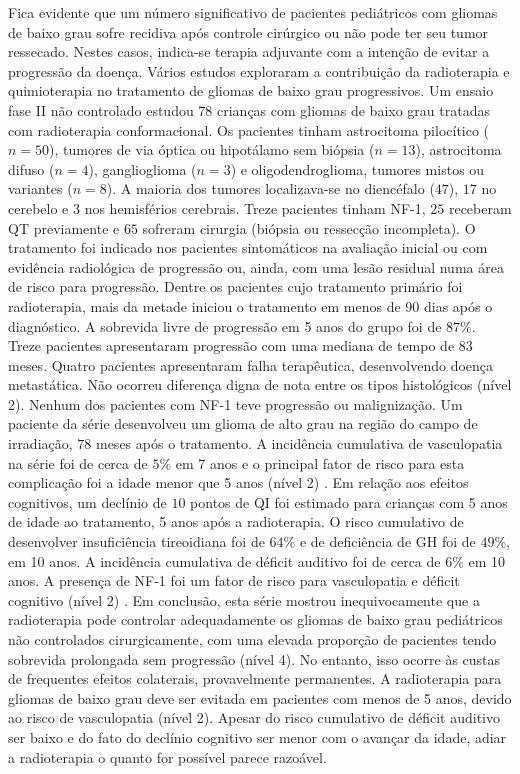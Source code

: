 \documentclass[11pt,a4paper,oldfontcommands]{memoir}
\begin{document}
Fica evidente que um número significativo de pacientes pediátricos com gliomas de baixo grau sofre recidiva após controle cirúrgico ou não pode ter seu tumor ressecado. Nestes casos, indica-se terapia adjuvante com a intenção de evitar a progressão da doença. Vários estudos exploraram a contribuição da radioterapia e quimioterapia no tratamento de gliomas de baixo grau progressivos. Um ensaio fase II não controlado estudou 78 crianças com gliomas de baixo grau tratadas com radioterapia conformacional. Os pacientes tinham astrocitoma pilocítico (\(n=50\)), tumores de via óptica ou hipotálamo sem biópsia (\(n=13\)), astrocitoma difuso (\(n=4\)), ganglioglioma (\(n=3\)) e oligodendroglioma, tumores mistos ou variantes (\(n=8\)). A maioria dos tumores localizava-se no diencéfalo (\(47\)), \(17\) no cerebelo e \(3\) nos hemisférios cerebrais. Treze pacientes tinham NF-1, \(25\) receberam QT previamente e \(65\) sofreram cirurgia (biópsia ou ressecção incompleta). O tratamento foi indicado nos pacientes sintomáticos na avaliação inicial ou com evidência radiológica de progressão ou, ainda, com uma lesão residual numa área de risco para progressão. Dentre os pacientes cujo tratamento primário foi radioterapia, mais da metade iniciou o tratamento em menos de 90 dias após o diagnóstico. A sobrevida livre de progressão em 5 anos do grupo foi de \(87\%\). Treze pacientes apresentaram progressão com uma mediana de tempo de \(83\) meses. Quatro pacientes apresentaram falha terapêutica, desenvolvendo doença metastática. Não ocorreu diferença digna de nota entre os tipos histológicos (nível 2). Nenhum dos pacientes com NF-1 teve progressão ou malignização. Um paciente da série desenvolveu um glioma de alto grau na região do campo de irradiação, \(78\) meses após o tratamento. A incidência cumulativa de vasculopatia na série foi de cerca de \(5\%\) em 7 anos e o principal fator de risco para esta complicação foi a idade menor que 5 anos (nível 2) \cite{Merchant01082009}. Em relação aos efeitos cognitivos, um declínio de \(10\) pontos de QI foi estimado para crianças com 5 anos de idade ao tratamento, 5 anos após a radioterapia. O risco cumulativo de desenvolver insuficiência tireoidiana foi de \(64\%\) e de deficiência de GH foi de \(49\%\), em 10 anos. A incidência cumulativa de déficit auditivo foi de cerca de \(6\%\) em 10 anos. A presença de NF-1 foi um fator de risco para vasculopatia e déficit cognitivo (nível 2) \cite{Merchant01082009.2}. Em conclusão, esta série mostrou inequivocamente que a radioterapia pode controlar adequadamente os gliomas de baixo grau pediátricos não controlados cirurgicamente, com uma elevada proporção de pacientes tendo sobrevida prolongada sem progressão (nível 4). No entanto, isso ocorre às custas de frequentes efeitos colaterais, provavelmente permanentes. A radioterapia para gliomas de baixo grau deve ser evitada em pacientes com menos de 5 anos, devido ao risco de vasculopatia (nível 2). Apesar do risco cumulativo de déficit auditivo ser baixo e do fato do declínio cognitivo ser menor com o avançar da idade, adiar a radioterapia o quanto for possível parece razoável.
\end{document}
